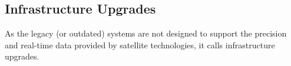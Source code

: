 



\subsection{Infrastructure Upgrades}

As the legacy (or outdated) systems are not designed to support the precision and real-time data provided by satellite technologies, it calls infrastructure upgrades. 




